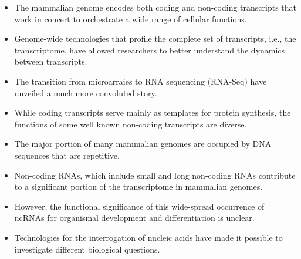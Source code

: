 \begin{itemize}

   \item The mammalian genome encodes both coding and non-coding transcripts that work in concert to orchestrate a wide range of cellular functions.
   \item Genome-wide technologies that profile the complete set of transcripts, i.e., the transcriptome, have allowed researchers to better understand the dynamics between transcripts.
   \item The transition from microarraies to RNA sequencing (RNA-Seq) have unveiled a much more convoluted story.
   \item While coding transcripts serve mainly as templates for protein synthesis, the functions of some well known non-coding transcripts are diverse.
   \item The major portion of many mammalian genomes are occupied by DNA sequences that are repetitive.
   \item Non-coding RNAs, which include small and long non-coding RNAs contribute to a significant portion of the transcriptome in mammalian genomes.
   \item However, the functional significance of this wide-spread occurrence of ncRNAs for organismal development and differentiation is unclear.
   \item Technologies for the interrogation of nucleic acids have made it possible to investigate different biological questions.

\end{itemize}
